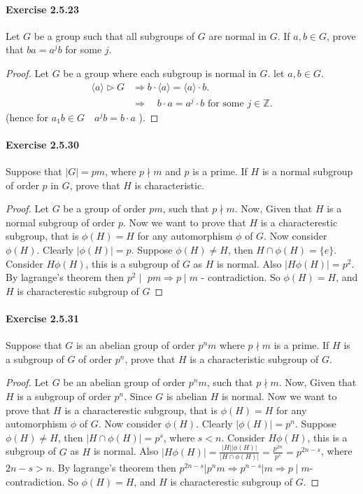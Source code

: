 \documentclass{article}
\begin{document}
\paragraph{Exercise 2.5.23} Let $G$ be a group such that all subgroups of $G$ are normal in $G$. If $a, b \in G$, prove that $ba = a^jb$ for some $j$.
\begin{proof}
    Let $G$ be a group where each subgroup is normal in $G$. let $a, b \in G$.
$$
\begin{aligned}
    \langle a\rangle\triangleright  G  &\Rightarrow b \cdot\langle a\rangle=\langle a\rangle \cdot b . \\
& \Rightarrow \quad b \cdot a=a^j \cdot b \text { for some } j \in \mathbb{Z}.
\end{aligned}
$$
(hence for $a_1 b \in G \quad a^j b=b \cdot a$ ).
\end{proof}



\paragraph{Exercise 2.5.30} Suppose that $|G| = pm$, where $p \nmid m$ and $p$ is a prime. If $H$ is a normal subgroup of order $p$ in $G$, prove that $H$ is characteristic.
\begin{proof}
    Let $G$ be a group of order $p m$, such that $p \nmid m$. Now, Given that $H$ is a normal subgroup of order $p$. Now we want to prove that $H$ is a characterestic subgroup, that is $\phi(H)=H$ for any automorphism $\phi$ of $G$. Now consider $\phi(H)$. Clearly $|\phi(H)|=p$. Suppose $\phi(H) \neq H$, then $H \cap \phi (H)=\{ e\}$. Consider $H \phi(H)$, this is a subgroup of $G$ as $H$ is normal. Also $|H \phi(H)|=p^2$. By lagrange's theorem then $p^2 \mid$ $p m \Longrightarrow p \mid m$ - contradiction. So $\phi(H)=H$, and $H$ is characterestic subgroup of $G$
\end{proof}



\paragraph{Exercise 2.5.31} Suppose that $G$ is an abelian group of order $p^nm$ where $p \nmid m$ is a prime.  If $H$ is a subgroup of $G$ of order $p^n$, prove that $H$ is a characteristic subgroup of $G$.
\begin{proof}
    Let $G$ be an abelian group of order $p^n m$, such that $p \nmid m$. Now, Given that $H$ is a subgroup of order $p^n$. Since $G$ is abelian $H$ is normal. Now we want to prove that $H$ is a characterestic subgroup, that is $\phi(H)=H$ for any automorphism $\phi$ of $G$. Now consider $\phi(H)$. Clearly $|\phi(H)|=p^n$. Suppose $\phi(H) \neq H$, then $|H \cap \phi(H)|=p^s$, where $s<n$. Consider $H \phi(H)$, this is a subgroup of $G$ as $H$ is normal. Also $|H \phi(H)|=\frac{|H||\phi(H)|}{|H \cap \phi(H)|}=\frac{p^{2 n}}{p^s}=p^{2 n-s}$, where $2 n-s>n$. By lagrange's theorem then $p^{2 n-s}\left|p^n m \Longrightarrow p^{n-s}\right| m \Longrightarrow p \mid m$-contradiction. So $\phi(H)=H$, and $H$ is characterestic subgroup of $G$.
\end{proof}
\end{document}
